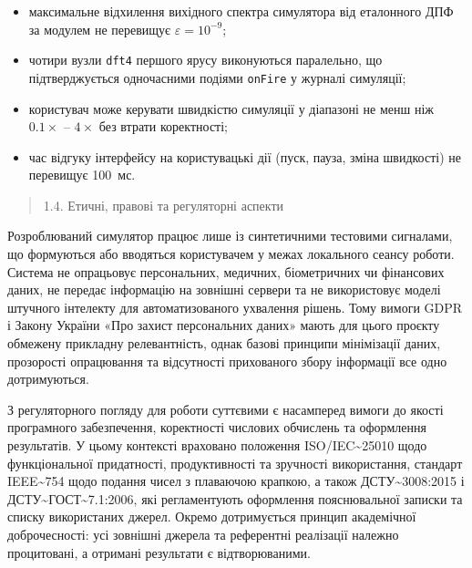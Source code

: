 \documentclass[
]{article}
\begin{document}
\begin{itemize}
\item
  максимальне відхилення вихідного спектра симулятора від еталонного ДПФ
  за модулем не перевищує \(\varepsilon = 10^{- 9}\);
\item
  чотири вузли \texttt{dft4} першого ярусу виконуються паралельно, що
  підтверджується одночасними подіями \texttt{onFire} у журналі
  симуляції;
\item
  користувач може керувати швидкістю симуляції у діапазоні не менш ніж
  \(0.1 \times\) -- \(4 \times\) без втрати коректності;
\item
  час відгуку інтерфейсу на користувацькі дії (пуск, пауза, зміна
  швидкості) не перевищує 100~мс.
\end{itemize}

\begin{quote}
\protect{}\label{ux435ux442ux438ux447ux43dux456-ux43fux440ux430ux432ux43eux432ux456-ux442ux430-ux440ux435ux433ux443ux43bux44fux442ux43eux440ux43dux456-ux430ux441ux43fux435ux43aux442ux438}{}1.4.
Етичні, правові та регуляторні аспекти
\end{quote}

Розроблюваний симулятор працює лише із синтетичними тестовими сигналами,
що формуються або вводяться користувачем у межах локального сеансу
роботи. Система не опрацьовує персональних, медичних, біометричних чи
фінансових даних, не передає інформацію на зовнішні сервери та не
використовує моделі штучного інтелекту для автоматизованого ухвалення
рішень. Тому вимоги GDPR і Закону України «Про захист персональних
даних» мають для цього проєкту обмежену прикладну релевантність, однак
базові принципи мінімізації даних, прозорості опрацювання та відсутності
прихованого збору інформації все одно дотримуються.

З регуляторного погляду для роботи суттєвими є насамперед вимоги до
якості програмного забезпечення, коректності числових обчислень та
оформлення результатів. У цьому контексті враховано положення
ISO/IEC\textasciitilde25010 щодо функціональної придатності,
продуктивності та зручності використання, стандарт
IEEE\textasciitilde754 щодо подання чисел з плаваючою крапкою, а також
ДСТУ\textasciitilde3008:2015 і
ДСТУ\textasciitilde ГОСТ\textasciitilde7.1:2006, які регламентують
оформлення пояснювальної записки та списку використаних джерел. Окремо
дотримується принцип академічної доброчесності: усі зовнішні джерела та
референтні реалізації належно процитовані, а отримані результати є
відтворюваними.
\end{document}
